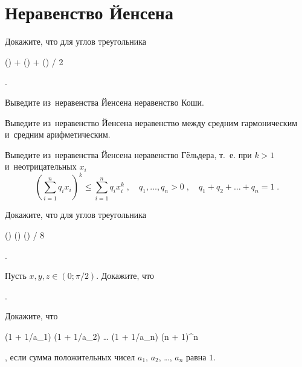 
\section*{Неравенство Йенсена}


\begin{problems}

\item
Докажите, что для углов треугольника
\begin{problemeq*}
    \sin(\alpha) + \sin(\beta) + \sin(\gamma)
  / 2
\end{problemeq*}.

\item
Выведите из~неравенства Йенсена неравенство Коши.

\item
Выведите из~неравенство Йенсена неравенство между средним гармоническим
и~средним арифметическим.

\item
Выведите из~неравенства Йенсена неравенство Гёльдера, т.~е. при $k > 1$
и~неотрицательных $x_{i}$
\[
    \left(
        \sum_{i=1}^{n}
            q_{i} x_{i}
    \right)^k
\leq
    \sum_{i=1}^{n}
        q_{i} x_{i}^k
\; , \quad
    q_{1}, \ldots, q_{n} > 0
\; , \quad
    q_{1} + q_{2} + \ldots + q_{n} = 1
\; . \]

\item
Докажите, что для углов треугольника
\begin{problemeq*}
    \cos(\alpha) \cdot \cos(\beta) \cdot \cos(\gamma)
 / 8
\end{problemeq*}.

\item
Пусть $x, y, z \in (0; \pi / 2)$.
Докажите, что
\begin{problemeq+}
\leq
\end{problemeq+}.

\item
Докажите, что
\begin{problemeq*} \def\frac#1#2{#1/#2}
    (1 + \frac{1}{a_{1}}) \cdot (1 + \frac{1}{a_{2}})
    \cdot \ldots \cdot
    (1 + \frac{1}{a_{n}})
\geq
    (n + 1)^n
\end{problemeq*},
если сумма положительных чисел $a_{1}$, $a_{2}$, \ldots, $a_{n}$ равна $1$.


\end{problems}

